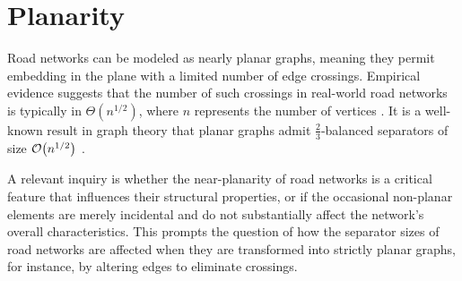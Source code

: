 
\section{Planarity} \label{sec:approach:planarity}

Road networks can be modeled as nearly planar graphs, meaning they permit embedding in the plane with a limited number of edge crossings.
Empirical evidence suggests that the number of such crossings in real-world road networks is typically in \(\Theta\!\left(n^{1/2}\right)\), where \(n\) represents the number of vertices \cite{eppstein_studying_2008}.
It is a well-known result in graph theory that planar graphs admit \(\frac23\)-balanced
separators of size \(\mathcal{O}\!\left({n}^{1/2}\right)\) \cite{lipton_separator_1979}.

A relevant inquiry is whether the near-planarity of road networks is a critical
feature that influences their structural properties, or if the occasional
non-planar elements are merely incidental and do not substantially affect the
network’s overall characteristics. This prompts the question of how the
separator sizes of road networks are affected when they are transformed into
strictly planar graphs, for instance, by altering edges to eliminate crossings.

